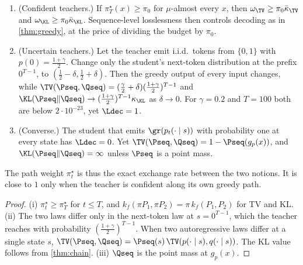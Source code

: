 \begin{corollary}\label{cor:separation}
\Pv\Ck
\begin{enumerate}[label=(\roman*),nosep]
\item (Confident teachers.) If $\pi^\star_T(x)\ge\pi_0$ for $\mu$-almost every $x$, then $\omega_{\TV}\ge\pi_0\bar\kappa_{\TV}$ and
$\omega_{\KL}\ge\pi_0\bar\kappa_{\KL}$. Sequence-level losslessness then controls decoding as in \cref{thm:greedy}, at
the price of dividing the budget by $\pi_0$.
\item (Uncertain teachers.) Let the teacher emit i.i.d.\ tokens from $\{0,1\}$ with $p(0)=\frac{1+\gamma}2$. Change only the
student's next-token distribution at the prefix $0^{T-1}$, to $(\frac12-\delta,\frac12+\delta)$. Then the greedy output of
every input changes, while $\TV(\Pseq,\Qseq)=(\frac\gamma2+\delta)(\frac{1+\gamma}2)^{T-1}$ and
$\KL(\Pseq\|\Qseq)\to(\frac{1+\gamma}2)^{T-1}\kappa_{\KL}$ as $\delta\to0$. For $\gamma=0.2$ and $T=100$ both are below
$2\cdot10^{-23}$, yet $\Ldec=1$.
\item (Converse.) The student that emits $\gr(p_t(\cdot\mid s))$ with probability one at every state has $\Ldec=0$. Yet
$\TV(\Pseq,\Qseq)=1-\Pseq(g_p(x))$, and $\KL(\Pseq\|\Qseq)=\infty$ unless $\Pseq$ is a point mass.
\end{enumerate}
The path weight $\pi^\star_t$ is thus the exact exchange rate between the two notions. It is close to $1$ only
when the teacher is confident along its own greedy path.
\end{corollary}
\begin{proof}
(i) $\pi^\star_t\ge\pi^\star_T$ for $t\le T$, and $k_f(\pi P_1,\pi P_2)=\pi\,k_f(P_1,P_2)$ for TV and KL.
(ii) The two laws differ only in the next-token law at $s=0^{T-1}$, which the teacher reaches with probability
$(\frac{1+\gamma}2)^{T-1}$. When two autoregressive laws differ at a single state $s$,
$\TV(\Pseq,\Qseq)=\Pseq(s)\,\TV(p(\cdot\mid s),q(\cdot\mid s))$. The KL value follows from \cref{thm:chain}.
(iii) $\Qseq$ is the point mass at $g_p(x)$.
\end{proof}

